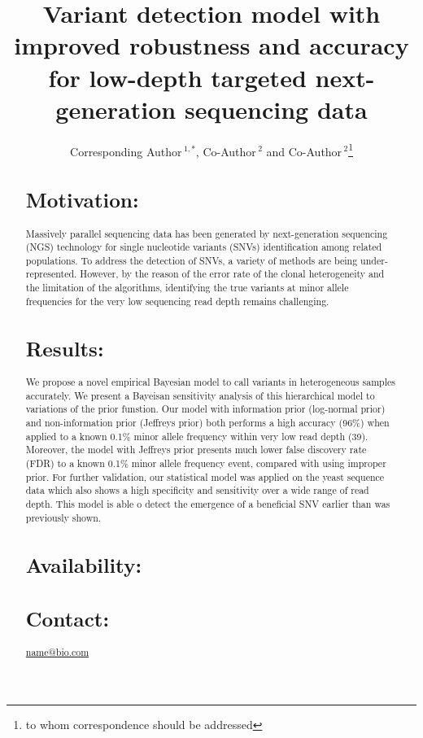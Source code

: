 \documentclass{bioinfo}
\begin{document}

\title[RVD3]{Variant detection model with improved robustness and accuracy for low-depth targeted next-generation sequencing data}
\author[Sample \textit{et~al}]{Corresponding Author\,$^{1,*}$, Co-Author\,$^{2}$ and Co-Author\,$^2$\footnote{to whom correspondence should be addressed}}
\address{$^{1}$Department of XXXXXXX, Address XXXX etc.\\
$^{2}$Department of XXXXXXXX, Address XXXX etc.}



\maketitle

\begin{abstract}

\section{Motivation:}
Massively parallel sequencing data has been generated by next-generation sequencing (NGS) technology for single nucleotide variants (SNVs) identification among related populations.
To address the detection of SNVs, a variety of methods are being under-represented.
However, by the reason of the error rate of the clonal heterogeneity and the limitation of the algorithms, identifying the true variants at minor allele frequencies for the very low sequencing read depth remains challenging.

\section{Results:}
We propose a novel empirical Bayesian model to call variants in heterogeneous samples accurately. We present a Bayeisan sensitivity analysis of this hierarchical model to variations of the prior funstion.
Our model with information prior (log-normal prior) and non-information prior (Jeffreys prior) both performs a high accuracy (96\%) when applied to a known 0.1\% minor allele frequency within very low read depth (39).
Moreover, the model with Jeffreys prior presents much lower false discovery rate (FDR) to a known 0.1\% minor allele frequency event, compared with using improper prior.
For further validation, our statistical model was applied on the yeast sequence data which also shows a high specificity and sensitivity over a wide range of read depth.
This model is able o detect the emergence of a beneficial SNV earlier than was previously shown.

\section{Availability:}


\section{Contact:} \href{name@bio.com}{name@bio.com}
\end{abstract}
\end{document}
